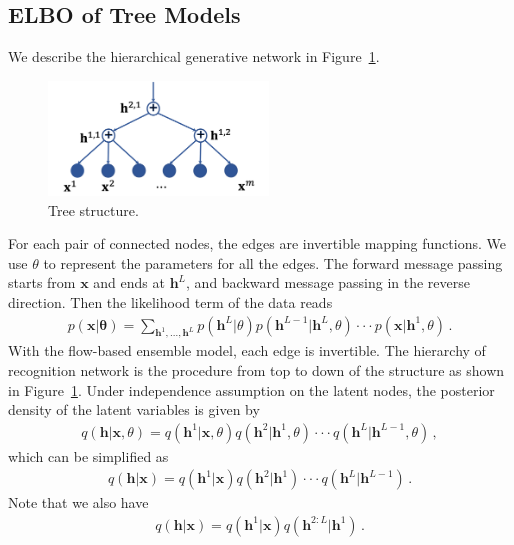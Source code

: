 \documentclass[twoside]{article}
\begin{document}
\subsection{ELBO of Tree Models}\label{appd:tree_elbo}



We describe the hierarchical generative network in Figure~\ref{fig:tree-d}. 
\begin{figure}[H]
    \centering
    \includegraphics[width=2.3in]{fig/tree_direct.png}
    \caption{Tree structure.}
    \label{fig:tree-d}
\end{figure}

For each pair of connected nodes, the edges are invertible mapping functions. 
We use $\theta$ to represent the parameters for all the edges.
The forward message passing starts from $\mathbf{x}$ and ends at $\mathbf{h}^L$, and backward message passing in the reverse direction. 
 Then the likelihood term of the data reads
\begin{align*}
p(\mathbf{x}| \mathbf{\theta}) = \sum_{\mathbf{h}^1, ..., \mathbf{h}^L} p(\mathbf{h}^L | \theta)p(\mathbf{h}^{L-1} | \mathbf{h}^{L},\theta) \cdot \cdot  \cdot  p(\mathbf{x} | \mathbf{h}^{1}, \theta) \, .
\end{align*}
With the flow-based ensemble model, each edge is invertible.   
The hierarchy of recognition network is the procedure from top to down of the structure as shown in Figure~\ref{fig:tree-d}.  
Under independence assumption on the latent nodes, the posterior density of the latent variables is given by
\begin{align*}
q(\mathbf{h}| \mathbf{x}, \theta ) = q(\mathbf{h}^1 | \mathbf{x}, \theta)  q(\mathbf{h}^2 | \mathbf{h}^1, \theta) \cdot \cdot  \cdot  q(\mathbf{h}^{L} | \mathbf{h}^{L-1}, \theta) \, ,
\end{align*}
which can be simplified as 
\begin{align*}
q(\mathbf{h}| \mathbf{x}) = q(\mathbf{h}^1 | \mathbf{x})  q(\mathbf{h}^2 | \mathbf{h}^1) \cdot \cdot  \cdot  q(\mathbf{h}^{L} | \mathbf{h}^{L-1}) \, .
\end{align*}
Note that we also have 
\begin{align} \label{eq:chain}
q(\mathbf{h}| \mathbf{x}) = q(\mathbf{h}^1 | \mathbf{x})  q(\mathbf{h}^{2:L} | \mathbf{h}^1) \, .
\end{align}
\end{document}
